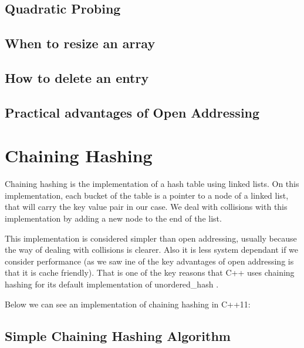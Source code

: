\subsection{Quadratic Probing}

\subsection{When to resize an array}

\subsection{How to delete an entry}

\subsection{Practical advantages of Open Addressing}

\section{Chaining Hashing}

Chaining hashing is the implementation of a hash table using linked lists. On this implementation, each bucket of the table is a pointer to a node of a linked list, that will carry the key value pair in our case. We deal with collisions with this implementation by adding a new node to the end of the list.

This implementation is considered simpler than open addressing, usually because the way of dealing with collisions is clearer. Also it is less system dependant if we consider performance (as we saw ine of the key advantages of open addressing is that it is cache friendly). That is one of the key reasons that C++ uses chaining hashing for its default implementation of unordered\_hash \cite{HashTableProposal}.

Below we can see an implementation of chaining hashing in C++11:

\subsection{Simple Chaining Hashing Algorithm}

